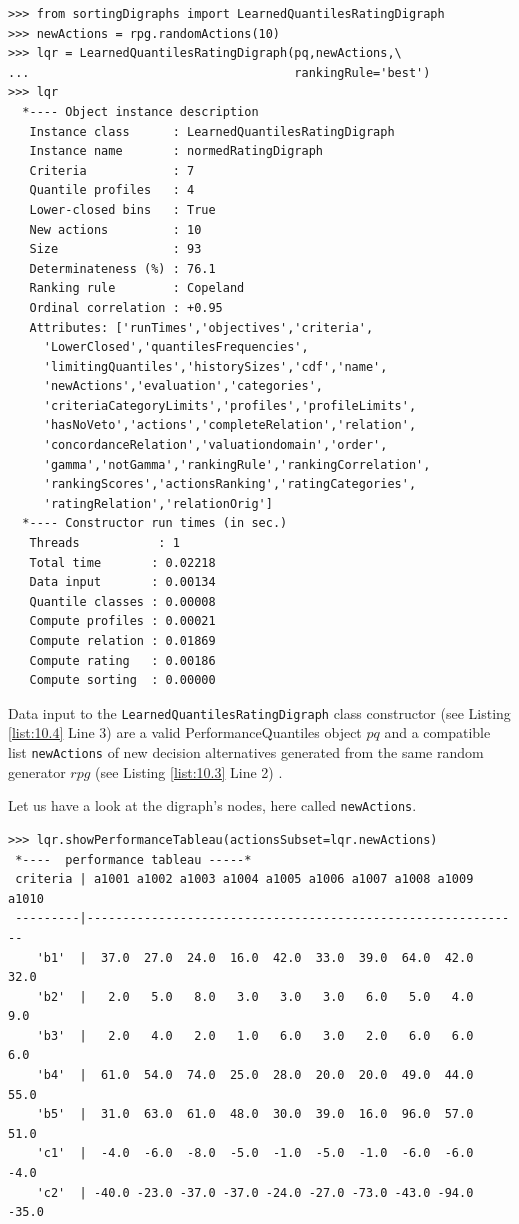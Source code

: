 \begin{lstlisting}[caption={Computing the absolute rating of 10 new decision alternatives},label=list:10.4]
>>> from sortingDigraphs import LearnedQuantilesRatingDigraph
>>> newActions = rpg.randomActions(10)
>>> lqr = LearnedQuantilesRatingDigraph(pq,newActions,\
...                                     rankingRule='best')
>>> lqr
  *---- Object instance description
   Instance class      : LearnedQuantilesRatingDigraph
   Instance name       : normedRatingDigraph
   Criteria            : 7
   Quantile profiles   : 4
   Lower-closed bins   : True
   New actions         : 10
   Size                : 93
   Determinateness (%) : 76.1
   Ranking rule        : Copeland
   Ordinal correlation : +0.95
   Attributes: ['runTimes','objectives','criteria',
     'LowerClosed','quantilesFrequencies',
     'limitingQuantiles','historySizes','cdf','name',
     'newActions','evaluation','categories',
     'criteriaCategoryLimits','profiles','profileLimits',
     'hasNoVeto','actions','completeRelation','relation',
     'concordanceRelation','valuationdomain','order',
     'gamma','notGamma','rankingRule','rankingCorrelation',
     'rankingScores','actionsRanking','ratingCategories',
     'ratingRelation','relationOrig']
  *---- Constructor run times (in sec.)
   Threads           : 1
   Total time       : 0.02218
   Data input       : 0.00134
   Quantile classes : 0.00008
   Compute profiles : 0.00021
   Compute relation : 0.01869
   Compute rating   : 0.00186
   Compute sorting  : 0.00000
\end{lstlisting}

Data input to the \texttt{LearnedQuantilesRatingDigraph} class constructor (see Listing \ref{list:10.4} Line 3) are a valid PerformanceQuantiles object $pq$ and a compatible list \texttt{newActions} of new decision alternatives generated from the same random generator $rpg$ (see Listing \ref{list:10.3} Line 2) .

Let us have a look at the digraph's nodes, here called \texttt{newActions}.

\begin{lstlisting}[caption={Performance tableau of the new incoming decision alternatives},label=list:10.5,basicstyle=\scriptsize]
>>> lqr.showPerformanceTableau(actionsSubset=lqr.newActions)
 *----  performance tableau -----*
 criteria | a1001 a1002 a1003 a1004 a1005 a1006 a1007 a1008 a1009 a1010   
 ---------|-------------------------------------------------------------
    'b1'  |  37.0  27.0  24.0  16.0  42.0  33.0  39.0  64.0  42.0  32.0  
    'b2'  |   2.0   5.0   8.0   3.0   3.0   3.0   6.0   5.0   4.0   9.0  
    'b3'  |   2.0   4.0   2.0   1.0   6.0   3.0   2.0   6.0   6.0   6.0  
    'b4'  |  61.0  54.0  74.0  25.0  28.0  20.0  20.0  49.0  44.0  55.0  
    'b5'  |  31.0  63.0  61.0  48.0  30.0  39.0  16.0  96.0  57.0  51.0  
    'c1'  |  -4.0  -6.0  -8.0  -5.0  -1.0  -5.0  -1.0  -6.0  -6.0  -4.0  
    'c2'  | -40.0 -23.0 -37.0 -37.0 -24.0 -27.0 -73.0 -43.0 -94.0 -35.0  
\end{lstlisting}
  
